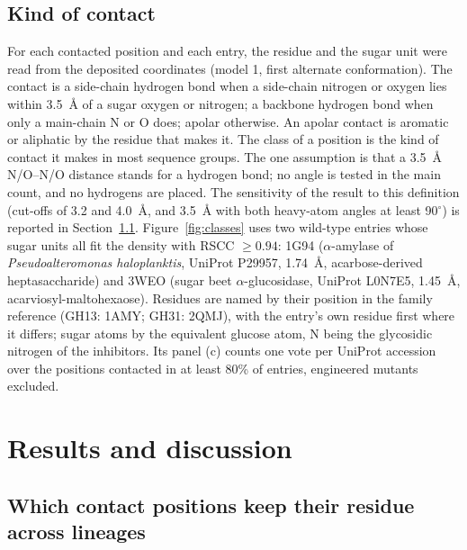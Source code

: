 \documentclass[preprint,12pt]{elsarticle}
\begin{document}
\subsection{Kind of contact}\label{sec:methods_contacts}
For each contacted position and each entry, the residue and
the sugar unit were read from the deposited coordinates (model 1, first alternate
conformation). The contact is a side-chain hydrogen bond when a side-chain nitrogen or
oxygen lies within 3.5~\AA{} of a sugar oxygen or nitrogen; a backbone hydrogen bond when
only a main-chain N or O does; apolar otherwise. An apolar contact is aromatic or
aliphatic by the residue that makes it. The class of a position is the kind of contact it
makes in most sequence groups. The one assumption is that a 3.5~\AA{} N/O--N/O distance
stands for a hydrogen bond; no angle is tested in the main count, and no hydrogens are
placed. The sensitivity of the result to this definition (cut-offs of 3.2 and 4.0~\AA, and
3.5~\AA{} with both heavy-atom angles at least 90$^\circ$) is reported in
Section~\ref{sec:rule}.
Figure~\ref{fig:classes} uses two wild-type entries whose sugar units all fit the density with
RSCC $\ge0.94$: 1G94 ($\alpha$-amylase of \textit{Pseudoalteromonas haloplanktis}, UniProt P29957, 1.74~\AA,
acarbose-derived heptasaccharide) and 3WEO (sugar beet $\alpha$-glucosidase, UniProt L0N7E5, 1.45~\AA,
acarviosyl-maltohexaose). Residues are named by their position in the family reference (GH13: 1AMY; GH31:
2QMJ), with the entry's own residue first where it differs; sugar atoms by the equivalent glucose atom, N
being the glycosidic nitrogen of the inhibitors. Its panel (c) counts one vote per UniProt accession over
the positions contacted in at least 80\% of entries, engineered mutants excluded.

\section{Results and discussion}

\subsection{Which contact positions keep their residue across lineages}\label{sec:rule}
\end{document}
